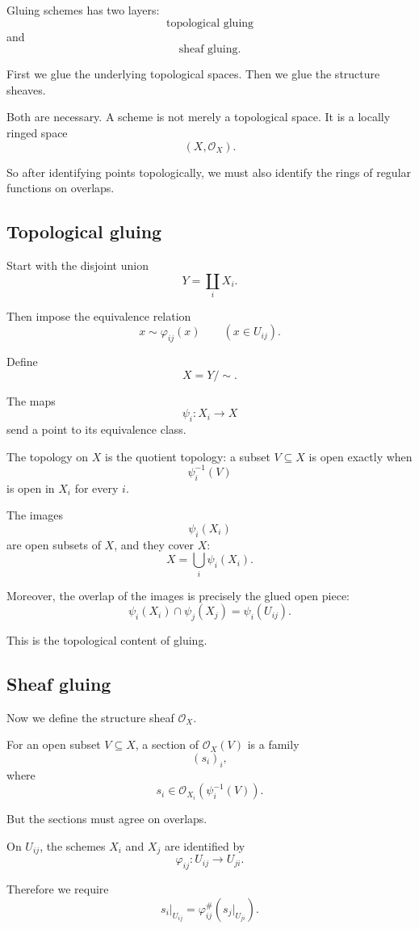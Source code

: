 \documentclass[12pt,a4paper]{article}
\newcommand{\OO}{\mathcal{O}}
\theoremstyle{notespace}
\begin{document}
Gluing schemes has two layers:
\[
\boxed{
	\text{topological gluing}
}
\]
and
\[
\boxed{
	\text{sheaf gluing}.
}
\]

First we glue the underlying topological spaces. Then we glue the structure sheaves.

Both are necessary. A scheme is not merely a topological space. It is a locally ringed space
\[
(X,\OO_X).
\]

So after identifying points topologically, we must also identify the rings of regular functions on overlaps.

\subsection{Topological gluing}

Start with the disjoint union
\[
Y=\coprod_i X_i.
\]

Then impose the equivalence relation
\[
x\sim\varphi_{ij}(x)
\qquad
(x\in U_{ij}).
\]

Define
\[
X=Y/{\sim}.
\]

The maps
\[
\psi_i:X_i\to X
\]
send a point to its equivalence class.

The topology on \(X\) is the quotient topology: a subset \(V\subseteq X\) is open exactly when
\[
\psi_i^{-1}(V)
\]
is open in \(X_i\) for every \(i\).

The images
\[
\psi_i(X_i)
\]
are open subsets of \(X\), and they cover \(X\):
\[
X=\bigcup_i\psi_i(X_i).
\]

Moreover, the overlap of the images is precisely the glued open piece:
\[
\psi_i(X_i)\cap\psi_j(X_j)=\psi_i(U_{ij}).
\]

This is the topological content of gluing.

\subsection{Sheaf gluing}

Now we define the structure sheaf \(\OO_X\).

For an open subset \(V\subseteq X\), a section of \(\OO_X(V)\) is a family
\[
(s_i)_i,
\]
where
\[
s_i\in\OO_{X_i}(\psi_i^{-1}(V)).
\]

But the sections must agree on overlaps.

On \(U_{ij}\), the schemes \(X_i\) and \(X_j\) are identified by
\[
\varphi_{ij}:U_{ij}\to U_{ji}.
\]

Therefore we require
\[
s_i|_{U_{ij}}
=
\varphi_{ij}^{\#}(s_j|_{U_{ji}}).
\]
\end{document}
